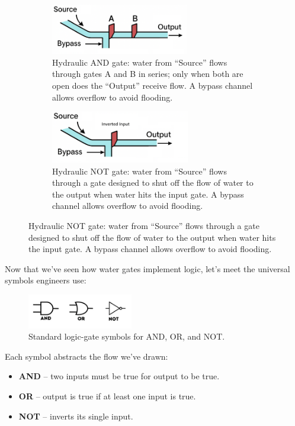 \documentclass{book}       %
\begin{document}
\begin{figure}[h]
  \centering
  \begin{subfigure}[b]{0.32\linewidth}
  \includegraphics[height=2.2cm]{images/waterway.png}
  \caption{Hydraulic AND gate: water from “Source” flows through gates A and B in series; only when both are open does the “Output” receive flow. A bypass channel allows overflow to avoid flooding.}
  \label{fig:water-and-gate}
  \end{subfigure}
  \hfill
  \begin{subfigure}[b]{0.32\linewidth}
  \includegraphics[height=2.3cm]{images/waterwayNOT.png}
    \caption{Hydraulic NOT gate: water from “Source” flows through a gate designed to shut off the flow of water to the output when water hits the input gate. A bypass channel allows overflow to avoid flooding.}
  \end{subfigure}
\end{figure}

\bigskip
\noindent Now that we’ve seen how water gates implement logic, let’s meet the universal symbols engineers use:

\begin{figure}[h]
  \centering
  \includegraphics[height=1.5cm]{logic_symbols.png}
  \caption{Standard logic-gate symbols for AND, OR, and NOT.}
  \label{fig:logic-symbols}
\end{figure}

\noindent
Each symbol abstracts the flow we’ve drawn:

\begin{itemize}[noitemsep]
  \item \textbf{AND} – two inputs must be true for output to be true.
  \item \textbf{OR} – output is true if at least one input is true.
  \item \textbf{NOT} – inverts its single input.
\end{itemize}
\end{document}
